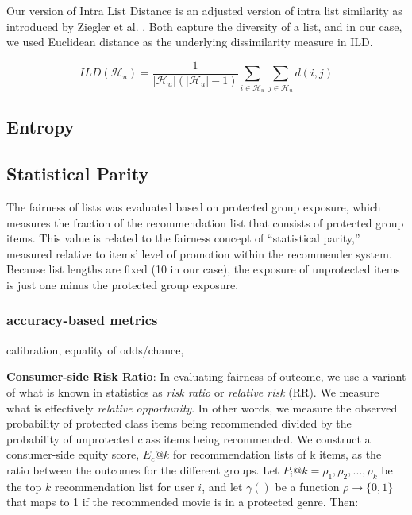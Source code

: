         
        Our version of Intra List Distance \cite{eskandanian2016user} is an adjusted version of intra list similarity as introduced by Ziegler et al. \cite{ziegler2005improving}. Both capture the diversity of a list, and in our case, we used Euclidean distance as the underlying dissimilarity measure in ILD.
        
        \begin{equation}
            ILD(\mathcal{H}_u) = \frac{1}{|\mathcal{H}_u|(|\mathcal{H}_u|-1)}\sum_{i \in \mathcal{H}_u}\sum_{j \in \mathcal{H}_u}d(i,j)
        \end{equation}

        
        
        \subsection{Entropy}
        
        \subsection{Statistical Parity}
        The fairness of lists was evaluated based on protected group exposure, which measures the fraction of the recommendation list that consists of protected group items. This value is related to the fairness concept of ``statistical parity,'' measured relative to items' level of promotion within the recommender system. Because list lengths are fixed (10 in our case), the exposure of unprotected items is just one minus the protected group exposure.
        
        
        \subsubsection{accuracy-based metrics}
        calibration, equality of odds/chance, 
        
        
        \textbf{Consumer-side Risk Ratio}: In evaluating fairness of outcome, we use a variant of what is known in statistics as \textit{risk ratio} or \textit{relative risk} (RR)\cite{romei2014multidisciplinary}. We measure what is effectively \textit{relative opportunity}. In other words, we measure the observed probability of protected class items being recommended divided by the probability of unprotected class items being recommended.
        We construct a consumer-side equity score, $E_c@k$ for recommendation lists of k items, as the ratio between the outcomes for the different groups. Let $P_i@k = {\rho_1, \rho_2, ..., \rho_k}$ be the top $k$ recommendation list for user $i$, and let $\gamma()$ be a function $\rho \rightarrow \{0,1\}$ that maps to 1 if the recommended movie is in a protected genre. Then:

